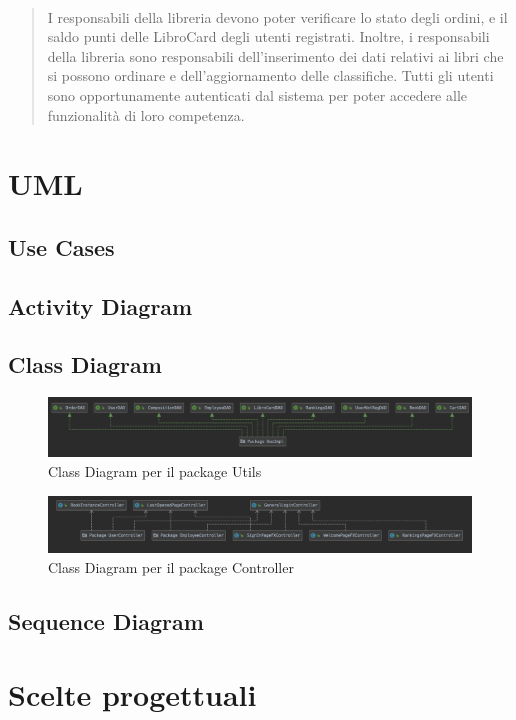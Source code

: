 \documentclass[12pt,a4paper]{article}
\begin{document}
\begin{quotation}
{		\paragraph{}I responsabili della libreria devono poter verificare lo stato degli ordini, e il saldo punti delle LibroCard degli utenti registrati.
		Inoltre, i responsabili della libreria sono responsabili dell’inserimento dei dati relativi ai libri che si possono ordinare e dell’aggiornamento delle classifiche.
		Tutti gli utenti sono opportunamente autenticati dal sistema per poter accedere alle funzionalità di loro competenza.}
	\end{quotation}
	\section{UML}
	\subsection{Use Cases}
	\subsection{Activity Diagram}
	\subsection{Class Diagram}
	\begin{figure}[h!]
		\centering
		\includegraphics[scale=0.4]{images/Utils.png}
		\caption{Class Diagram per il package Utils}
	\end{figure}
	\begin{figure}[h!]
		\centering
		\includegraphics[scale=0.4]{images/Controller.png}
		\caption{Class Diagram per il package Controller}
	\end{figure}
	\subsection{Sequence Diagram}
	\section{Scelte progettuali}
\end{document}
